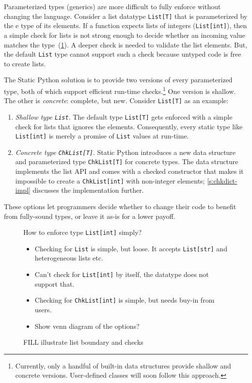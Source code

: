 \documentclass[english,cleveref,submission]{programming}
\newcommand{\SP}{Static Python}
\newcommand{\code}[1]{\texttt{#1}}
\begin{document}
Parameterized types (generics) are more difficult to fully enforce without
changing the language.
Consider a list datatype \code{List[T]} that is parameterized by the
e type of its elements.
If a function expects lists of integers (\code{List[int]}), then a simple check
for lists is not strong enough to decide whether an incoming value matches the
type~(\cref{f:list-boundary}).
A deeper check is needed to validate the list elements.
But, the default \code{List} type cannot support such a check because untyped
code is free to create lists.

The \SP{} solution is to provide two versions of every parameterized type,
both of which support efficient run-time checks.\footnote{Currently, only a handful
of built-in data structures provide shallow and concrete versions. User-defined
classes will soon follow this approach.}
One version is shallow.
The other is \emph{concrete}: complete, but new.
Consider \code{List[T]} as an example:
\begin{enumerate}
  \item
    \emph{Shallow type \code{List}}.
    The default type \code{List[T]} gets enforced with a simple check for lists that ignores
    the elements.
    Consequently, every static type like \code{List[int]} is merely a promise of \code{List}
    values at run-time.
  \item
    \emph{Concrete type \code{ChkList[T]}}.
    \SP{} introduces a new data structure and parameterized type \code{ChkList[T]}
    for concrete types.
    The data structure implements the list API and comes with a checked constructor that
    makes it impossible to create a \code{ChkList[int]} with non-integer elements;
    \cref{s:chkdict-impl} discusses the implementation further.
\end{enumerate}
%
These options let programmers decide whether to change their code to benefit from
fully-sound types, or leave it as-is for a lower payoff.


\begin{figure}[t]
  How to enforce type \code{List[int]} simply?
  \begin{itemize}
    \item Checking for \code{List} is simple, but loose. It accepts \code{List[str]} and heterogeneous lists etc.
    \item Can't check for \code{List[int]} by itself, the datatype does not support that.
    \item Checking for \code{ChkList[int]} is simple, but needs buy-in from users.
    \item Show venn diagram of the options?
  \end{itemize}
  \caption{FILL illustrate list boundary and checks}
  \label{f:list-boundary}
\end{figure}
\end{document}
